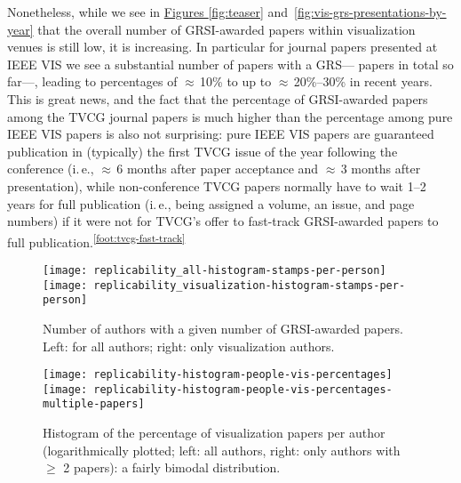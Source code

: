 \documentclass[conference,svgnames]{vgtc}                     %
\newcommand{\ie}{i.\,e.}
\begin{document}
Nonetheless, while we see in \hyperref[fig:teaser]{Figures \ref{fig:teaser}} and~\ref{fig:vis-grs-presentations-by-year} that the overall number of GRSI-awarded papers within visualization venues is still low, it is increasing. In particular for journal papers presented at IEEE VIS we see a substantial number of papers with a GRS---\GrsiIeeeVisTvcgJournalPresentationsCount{} papers in total so far---, leading to percentages of $\approx$\,10\% to up to $\approx$\,20\%--30\% in recent years. This is great news, and the fact that the percentage of GRSI-awarded papers among the TVCG journal papers is much higher than the percentage among pure IEEE VIS papers is also not surprising: pure IEEE VIS papers are guaranteed publication in (typically) the first TVCG issue of the year following the conference (\ie, $\approx$\,6 months after paper acceptance and $\approx$\,3 months after presentation), while non-con\-fe\-rence TVCG papers normally have to wait 1--2 years for full publication (\ie, being assigned a volume, an issue, and page numbers) if it were not for TVCG's offer to fast-track GRSI-awarded papers to full publication.\textsuperscript{\ref{foot:tvcg-fast-track}}

\begin{figure}
	\centering
	\texttt{[image: replicability\_all-histogram-stamps-per-person]}\hfill%
	\texttt{[image: replicability\_visualization-histogram-stamps-per-person]}%
	\caption{Number of authors with a given number of GRSI-awarded papers. Left: for all authors; right: only visualization authors.}
	\label{fig:vis-grs-per-author}
\end{figure}

\begin{figure}
	\centering
	\texttt{[image: replicability-histogram-people-vis-percentages]}\hfill%
	\texttt{[image: replicability-histogram-people-vis-percentages-multiple-papers]}%
	\caption{Histogram of the percentage of visualization papers per author (logarithmically plotted; left: all authors, right: only authors with $\geq$ 2 papers): a fairly bimodal distribution.}
	\label{fig:histogram-author-vis-percentage}
\end{figure}
\end{document}
